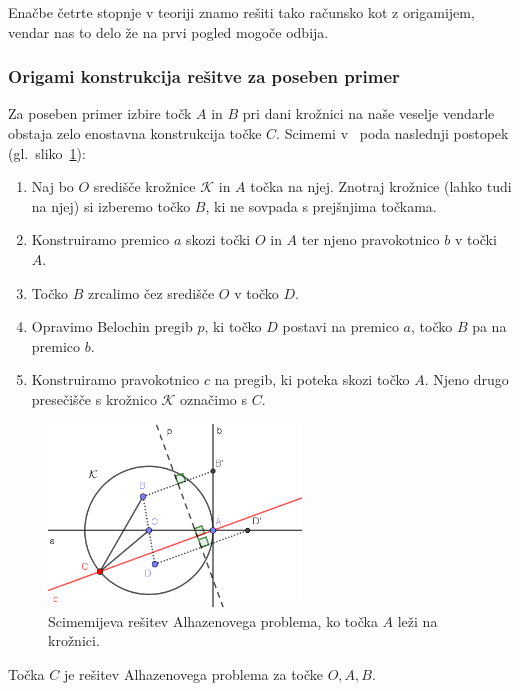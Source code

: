 Enačbe četrte stopnje v teoriji znamo rešiti tako računsko kot z origamijem, vendar nas to delo že na prvi pogled mogoče odbija.

\subsubsection*{Origami konstrukcija rešitve za poseben primer}

Za poseben primer izbire točk $A$ in $B$ pri dani krožnici na naše veselje vendarle obstaja zelo enostavna konstrukcija točke $C$. Scimemi v~\cite[str.\ 116-117]{scimemi2002} poda naslednji postopek (gl.\ sliko~\ref{fig:scimemi}):
\begin{enumerate}
    \item Naj bo $O$ središče krožnice $\mathcal{K}$ in $A$ točka na njej. Znotraj krožnice (lahko tudi na njej) si izberemo točko $B$, ki ne sovpada s prejšnjima točkama.
    \item Konstruiramo premico $a$ skozi točki $O$ in $A$ ter njeno pravokotnico $b$ v točki $A$.
    \item Točko $B$ zrcalimo čez središče $O$ v točko $D$.
    \item Opravimo Belochin pregib $p$, ki točko $D$ postavi na premico $a$, točko $B$ pa na premico $b$.
    \item Konstruiramo pravokotnico $c$ na pregib, ki poteka skozi točko $A$. Njeno drugo presečišče s krožnico $\mathcal{K}$ označimo s $C$.
\end{enumerate}

\begin{figure}[h]
    \centering
    \includegraphics[width=0.6\textwidth]{images/alhazen/scimemi.png}
    \caption[Scimemijeva rešitev]{Scimemijeva rešitev Alhazenovega problema, ko točka $A$ leži na krožnici.}
    \label{fig:scimemi}
\end{figure}

\begin{trditev}
    Točka $C$ je rešitev Alhazenovega problema za točke $O, A, B$.
\end{trditev}

